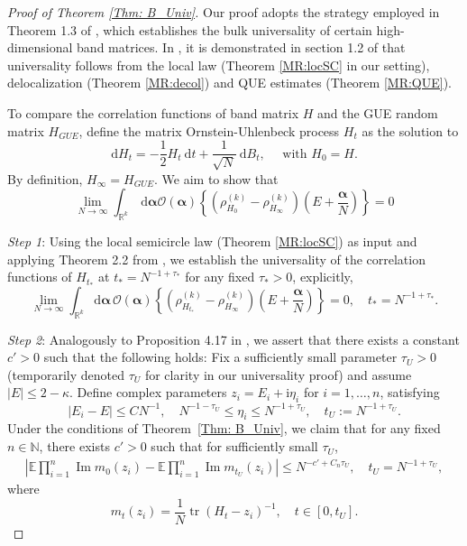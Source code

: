 \documentclass[10pt,reqno]{article}
\theoremstyle{plain} %
\theoremstyle{remark}
\numberwithin{equation}{section}
\begin{document}
 \begin{proof}[Proof of Theorem \ref{Thm: B_Univ}]
 Our proof adopts the strategy employed in Theorem 1.3 of \cite{Xu:2024aa}, which establishes the bulk universality of certain high-dimensional band matrices. In \cite{Xu:2024aa}, it is demonstrated in  section 1.2 of \cite{Xu:2024aa} that universality follows from the local law (Theorem \ref{MR:locSC} in our setting), 
 delocalization (Theorem \ref{MR:decol}) 
 and QUE estimates (Theorem \ref{MR:QUE}). 

 
To compare the correlation functions of band matrix $H$ and the GUE random matrix $H_{GUE}$,  define  the matrix Ornstein-Uhlenbeck process $H_t$ as the solution to
\begin{equation}\label{defUnivHt}
\mathrm{d} H_t=-\frac{1}{2} H_t \mathrm{~d} t+\frac{1}{\sqrt{N}} \mathrm{~d} B_t, \quad \text { with } H_0=H.   
\end{equation}
By definition, $H_\infty=H_{GUE}$. We aim to  show that 
\begin{equation}\label{0infy}
\lim _{N \rightarrow \infty} \int_{\mathbb{R}^k} \mathrm{~d} \boldsymbol{\alpha} \mathcal{O}(\boldsymbol{\alpha})\left\{\left(\rho_{H_0}^{(k)}-\rho_{H_\infty}^{(k)}\right)\left(E+\frac{\boldsymbol{\alpha}}{N}\right)\right\}=0 
 \end{equation}  


\medskip 
\noindent 
\emph{Step 1}: Using the local semicircle law (Theorem \ref{MR:locSC}) as input and applying Theorem 2.2 from \cite{LANDON20191137}, we establish the universality of the correlation functions of $H_{t_*}$ at $t_*=N^{-1+\tau_*}$ for any fixed $\tau_*>0$, explicitly,
\begin{equation}\label{1infyuniv}
\lim_{N \rightarrow \infty} \int_{\mathbb{R}^k} \mathrm{d} \boldsymbol{\alpha}\, \mathcal{O}(\boldsymbol{\alpha}) \left\{\left(\rho_{H_{t_*}}^{(k)} - \rho_{H_\infty}^{(k)}\right)\left(E+\frac{\boldsymbol{\alpha}}{N}\right)\right\}=0,\quad t_*=N^{-1+\tau_*}.
\end{equation}


\medskip 
\noindent 
\emph{Step 2}: Analogously to Proposition 4.17 in \cite{Xu:2024aa}, we assert that there exists a constant $c'>0$ such that the following holds:
Fix a sufficiently small parameter $\tau_U>0$ (temporarily denoted $\tau_U$ for clarity in our universality proof) and assume $|E| \leq 2-\kappa$. Define complex parameters $z_i=E_i+\mathrm{i}\eta_i$ for $i=1,\dots,n$, satisfying
\begin{equation}\label{qkhzle23}
|E_i - E| \leq C N^{-1},\quad N^{-1-\tau_U} \leq \eta_i \leq N^{-1+\tau_U},\quad t_U:=N^{-1+\tau_U}.
\end{equation}
Under the conditions of Theorem~\ref{Thm: B_Univ}, we claim that for any fixed $n \in \mathbb{N}$, there exists $c'>0$ such that for sufficiently small $\tau_U$,
\begin{align}\label{417}
\left|\mathbb{E} \prod_{i=1}^n \operatorname{Im} m_0(z_i) - \mathbb{E} \prod_{i=1}^n \operatorname{Im} m_{t_U}(z_i)\right| \leq N^{-c'+C_n \tau_U},\quad t_U=N^{-1+\tau_U},
\end{align}
where
\[
m_t(z_i)= \frac{1}{N}\operatorname{tr}(H_t-z_i)^{-1}, \quad t\in [0, t_U].
\]


\end{proof}
\end{document}
